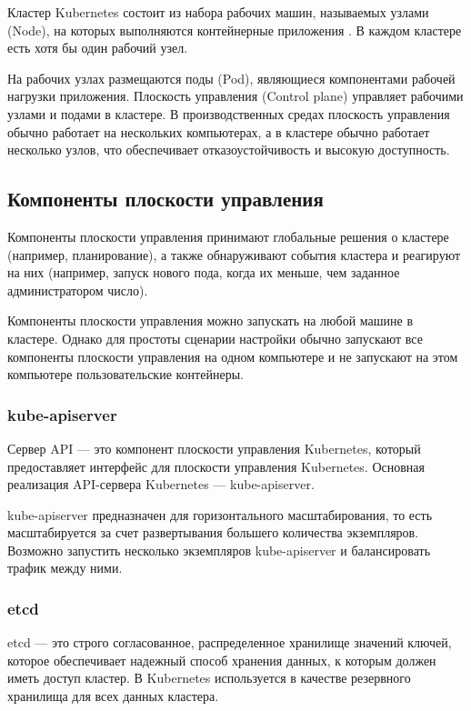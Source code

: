 \documentclass[a4page]{article}
\begin{document}
Кластер Kubernetes состоит из набора рабочих машин, называемых узлами (Node), на которых выполняются контейнерные приложения \cite{k8s:cluster-architecture}. В каждом кластере есть хотя бы один рабочий узел.

На рабочих узлах размещаются поды (Pod), являющиеся компонентами рабочей нагрузки приложения. Плоскость управления (Control plane) управляет рабочими узлами и подами в кластере. В производственных средах плоскость управления обычно работает на нескольких компьютерах, а в кластере обычно работает несколько узлов, что обеспечивает отказоустойчивость и высокую доступность\cite{k8s:components}.

\subsection{Компоненты плоскости управления}
Компоненты плоскости управления принимают глобальные решения о кластере (например, планирование), а также обнаруживают события кластера и реагируют на них (например, запуск нового пода, когда их меньше, чем заданное администратором число)\cite{k8s:cp-components}.

Компоненты плоскости управления можно запускать на любой машине в кластере. Однако для простоты сценарии настройки обычно запускают все компоненты плоскости управления на одном компьютере и не запускают на этом компьютере пользовательские контейнеры.

\subsubsection{kube-apiserver}
Сервер API --- это компонент плоскости управления Kubernetes, который \\предоставляет интерфейс для плоскости управления Kubernetes. Основная реализация API-сервера Kubernetes --- kube-apiserver.

kube-apiserver предназначен для горизонтального масштабирования, то есть масштабируется за счет развертывания большего количества экземпляров. Возможно запустить несколько экземпляров kube-apiserver и балансировать трафик между ними.

\subsubsection{etcd}
etcd — это строго согласованное, распределенное хранилище значений ключей, которое обеспечивает надежный способ хранения данных, к которым должен иметь доступ кластер. В Kubernetes используется в качестве резервного хранилища для всех данных кластера.
\end{document}
